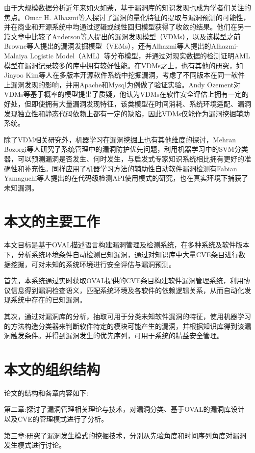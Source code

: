 \documentclass[a4paper]{ctexrep}
\begin{document}
		由于大规模数据分析近年来如火如荼，基于漏洞库的知识发现也成为学者们关注的焦点。Omar H. Alhazmi等人探讨了漏洞的量化特征的提取与漏洞预测的可能性，并在商业和开源系统中均通过逻辑或线性回归模型获得了收敛的结果。他们在另一篇文章中比较了Anderson等人提出的漏洞发现模型（VDMs），以及该模型之前Browne等人提出的漏洞发掘模型（VEMs），还有Alhazmi等人提出的Alhazmi-Malaiya Logistic Model（AML）等分布模型，并通过对现实数据的检测证明AML模型在漏洞记录较多的库中拥有较好性能。在VDMs之上，也有其他的研究，如Jinyoo Kim等人在多版本开源软件系统中挖掘漏洞，考虑了不同版本在同一软件上漏洞发现的影响，并用Apache和Mysql为例做了验证实验。Andy Ozement对VDMs等基于概率的模型提出了质疑，他认为VDMs在软件安全评估上拥有一定的好处，但即使拥有大量漏洞发现特征，该类模型在时间消耗、系统环境适配、漏洞发现独立性和静态代码依赖上都有一定的缺陷，因此VDMs仅能作为漏洞挖掘辅助系统。
		
		除了VDM相关研究外，机器学习在漏洞挖掘上也有其他维度的探讨，Mehran Bozorgi等人研究了系统管理中的漏洞防护优先问题，利用机器学习中的SVM分类器，可以预测漏洞是否发生、何时发生，与启发式专家知识系统相比拥有更好的准确性和补充性。同样应用了机器学习方法的辅助性自动软件漏洞检测有Fabian Yamaguchi等人提出的在代码级检测API使用模式的研究，也在真实环境下捕获了未知漏洞。
		\section{本文的主要工作}
		本文目标是基于OVAL描述语言构建漏洞管理及检测系统，在多种系统及软件版本下，分析系统环境条件自动检测已知漏洞，通过对知识库中大量CVE条目进行数据挖掘，可对未知的系统环境进行安全评估与漏洞预测。

		首先，本系统通过实时获取OVAL提供的CVE条目构建软件漏洞管理系统，利用协议信息得到漏洞检查语义，匹配系统环境及各软件的依赖逻辑关系，从而自动化发现系统中存在的已知漏洞。
		
		其次，通过对漏洞库的分析，抽取可用于分类未知软件漏洞的特征，使用机器学习的方法构造分类器来判断软件特定的模块可能产生的漏洞，并根据知识库得到该漏洞触发条件。并得到漏洞发生的优先序列，可用于系统的精益安全管理。
		\section{本文的组织结构}
		论文的结构和各章内容如下:
		
		第二章:探讨了漏洞管理相关理论与技术，对漏洞分类、基于OVAL的漏洞库设计以及CVE的管理模式进行了分析。
		
		第三章:研究了漏洞发生模式的挖掘技术，分别从先验角度和时间序列角度对漏洞发生模式进行讨论。
		
\end{document}
